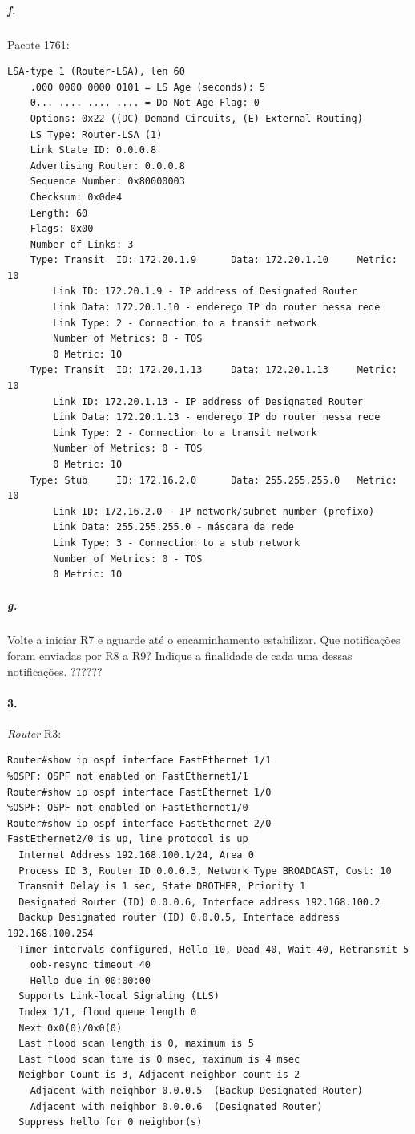 \subparagraph{f.}
Pacote 1761:
\begin{verbatim}
LSA-type 1 (Router-LSA), len 60
    .000 0000 0000 0101 = LS Age (seconds): 5
    0... .... .... .... = Do Not Age Flag: 0
    Options: 0x22 ((DC) Demand Circuits, (E) External Routing)
    LS Type: Router-LSA (1)
    Link State ID: 0.0.0.8
    Advertising Router: 0.0.0.8
    Sequence Number: 0x80000003
    Checksum: 0x0de4
    Length: 60
    Flags: 0x00
    Number of Links: 3
    Type: Transit  ID: 172.20.1.9      Data: 172.20.1.10     Metric: 10
        Link ID: 172.20.1.9 - IP address of Designated Router
        Link Data: 172.20.1.10 - endereço IP do router nessa rede
        Link Type: 2 - Connection to a transit network
        Number of Metrics: 0 - TOS
        0 Metric: 10
    Type: Transit  ID: 172.20.1.13     Data: 172.20.1.13     Metric: 10
        Link ID: 172.20.1.13 - IP address of Designated Router
        Link Data: 172.20.1.13 - endereço IP do router nessa rede
        Link Type: 2 - Connection to a transit network
        Number of Metrics: 0 - TOS
        0 Metric: 10
    Type: Stub     ID: 172.16.2.0      Data: 255.255.255.0   Metric: 10
        Link ID: 172.16.2.0 - IP network/subnet number (prefixo)
        Link Data: 255.255.255.0 - máscara da rede
        Link Type: 3 - Connection to a stub network
        Number of Metrics: 0 - TOS
        0 Metric: 10
\end{verbatim}

\subparagraph{g.}
Volte a iniciar R7 e aguarde até o encaminhamento estabilizar. Que notificações foram enviadas por R8 a R9? Indique a finalidade de cada uma dessas notificações.
??????

\paragraph{3.}
\emph{Router} \textsf{R3}:
\begin{verbatim}
Router#show ip ospf interface FastEthernet 1/1
%OSPF: OSPF not enabled on FastEthernet1/1
Router#show ip ospf interface FastEthernet 1/0
%OSPF: OSPF not enabled on FastEthernet1/0
Router#show ip ospf interface FastEthernet 2/0
FastEthernet2/0 is up, line protocol is up 
  Internet Address 192.168.100.1/24, Area 0 
  Process ID 3, Router ID 0.0.0.3, Network Type BROADCAST, Cost: 10
  Transmit Delay is 1 sec, State DROTHER, Priority 1 
  Designated Router (ID) 0.0.0.6, Interface address 192.168.100.2
  Backup Designated router (ID) 0.0.0.5, Interface address 192.168.100.254
  Timer intervals configured, Hello 10, Dead 40, Wait 40, Retransmit 5
    oob-resync timeout 40
    Hello due in 00:00:00
  Supports Link-local Signaling (LLS)
  Index 1/1, flood queue length 0
  Next 0x0(0)/0x0(0)
  Last flood scan length is 0, maximum is 5
  Last flood scan time is 0 msec, maximum is 4 msec
  Neighbor Count is 3, Adjacent neighbor count is 2 
    Adjacent with neighbor 0.0.0.5  (Backup Designated Router)
    Adjacent with neighbor 0.0.0.6  (Designated Router)
  Suppress hello for 0 neighbor(s)
\end{verbatim}

